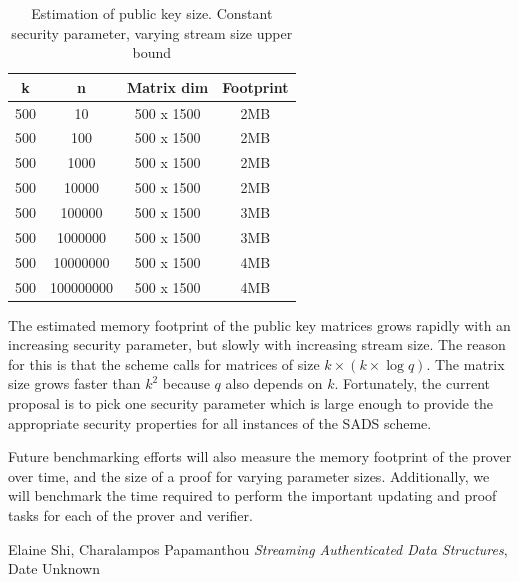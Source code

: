 \documentclass[11pt, letterpaper, oneside]{article}
\begin{document}
	
	\begin{table}[h]
	\centering
		\begin{tabular}{ c | c | c | c}
		k & n & Matrix dim & Footprint\\ \hline
		500&10&500 x 1500&2MB\\
		500&100&500 x 1500&2MB\\
		500&1000&500 x 1500&2MB\\
		500&10000&500 x 1500&2MB\\
		500&100000&500 x 1500&3MB\\
		500&1000000&500 x 1500&3MB\\
		500&10000000&500 x 1500&4MB\\
		500&100000000&500 x 1500&4MB\\
		
		\end{tabular}
	\caption{ Estimation of public key size. Constant security parameter, varying stream size upper bound }
	\label{tab:pub-key-n}
	\end{table}
	

	The estimated memory footprint of the public key matrices grows rapidly with an increasing security parameter, but slowly with increasing stream size.
	The reason for this is that the scheme calls for matrices of size $k  \times ( k \times \log q )$.
	The matrix size grows faster than $k^2$ because $q$ also depends on $k$.
	Fortunately, the current proposal is to pick one security parameter which is large enough to provide the appropriate security properties for all instances of the SADS scheme.
	
	Future benchmarking efforts will also measure the memory footprint of the prover over time, and the size of a proof for varying parameter sizes. Additionally, we will benchmark the time required to perform the important updating and proof tasks for each of the prover and verifier. 
	
	



\begin{thebibliography}{9}
	 Elaine Shi, Charalampos Papamanthou \emph{Streaming Authenticated Data Structures}, Date Unknown
	\end{thebibliography}
\end{document}
